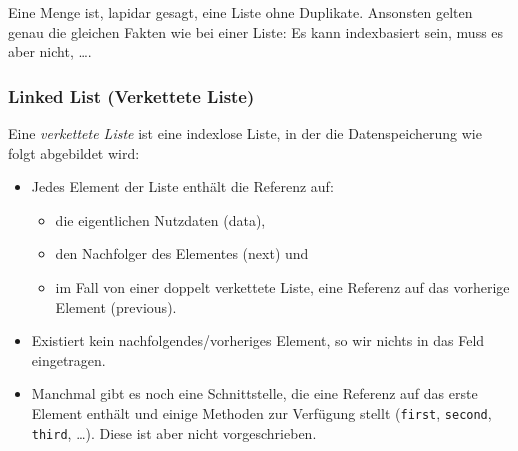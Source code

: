 		Eine Menge ist, lapidar gesagt, eine Liste ohne Duplikate. Ansonsten gelten genau die gleichen Fakten wie bei einer Liste: Es kann indexbasiert sein, muss es aber nicht, \dots.
	
	\subsubsection{Linked List (Verkettete Liste)}
		Eine \textit{verkettete Liste} ist eine indexlose Liste, in der die Datenspeicherung wie folgt abgebildet wird:
		\begin{itemize}
			\item Jedes Element der Liste enthält die Referenz auf:
				\begin{itemize}
					\item die eigentlichen Nutzdaten (data),
					\item den Nachfolger des Elementes (next) und
					\item im Fall von einer doppelt verkettete Liste, eine Referenz auf das vorherige Element (previous).
				\end{itemize}
			\item Existiert kein nachfolgendes/vorheriges Element, so wir nichts in das Feld eingetragen.
			\item Manchmal gibt es noch eine Schnittstelle, die eine Referenz auf das erste Element enthält und einige Methoden zur Verfügung stellt (\texttt{first}, \texttt{second}, \texttt{third}, \dots). Diese ist aber nicht vorgeschrieben.
		\end{itemize}
		
